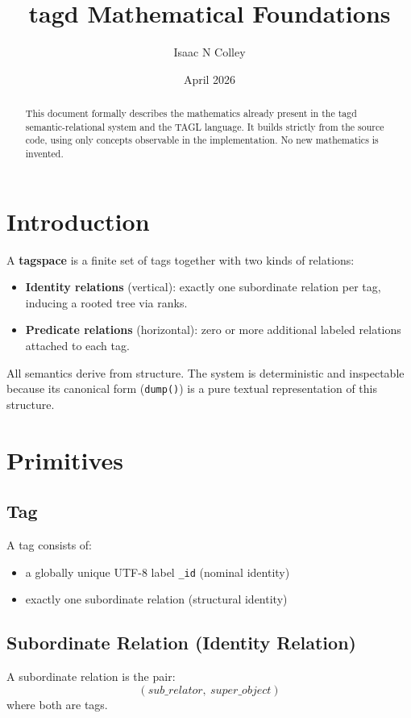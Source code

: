 \documentclass[11pt,a4paper]{article}
\title{tagd Mathematical Foundations}
\author{Isaac N Colley}
\date{April 2026}
\begin{document}
\maketitle

\begin{abstract}
This document formally describes the mathematics already present in the tagd semantic-relational system and the TAGL language. It builds strictly from the source code, using only concepts observable in the implementation. No new mathematics is invented.
\end{abstract}

\section{Introduction}

A \textbf{tagspace} is a finite set of tags together with two kinds of relations:

\begin{itemize}
    \item \textbf{Identity relations} (vertical): exactly one subordinate relation per tag, inducing a rooted tree via ranks.
    \item \textbf{Predicate relations} (horizontal): zero or more additional labeled relations attached to each tag.
\end{itemize}

All semantics derive from structure. The system is deterministic and inspectable because its canonical form (\texttt{dump()}) is a pure textual representation of this structure.

\section{Primitives}

\subsection{Tag}
A tag consists of:
\begin{itemize}
    \item a globally unique UTF-8 label \texttt{\_id} (nominal identity)
    \item exactly one subordinate relation (structural identity)
\end{itemize}

\subsection{Subordinate Relation (Identity Relation)}
A subordinate relation is the pair:
\[
(sub\_relator,\ super\_object)
\]
where both are tags.
\end{document}
